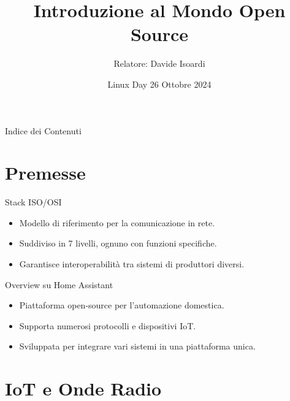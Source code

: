 \documentclass{beamer}
\title{Introduzione al Mondo Open Source}
\author{Relatore: Davide Isoardi}
\date{Linux Day 26 Ottobre 2024}
\begin{document}
	
	\begin{frame}
		\titlepage
	\end{frame}
	
	\begin{frame}{Indice dei Contenuti}
		\tableofcontents
	\end{frame}
	
	\section{Premesse}
	
	\begin{frame}{Stack ISO/OSI}
		\begin{itemize}
			\item Modello di riferimento per la comunicazione in rete.
			\item Suddiviso in 7 livelli, ognuno con funzioni specifiche.
			\item Garantisce interoperabilità tra sistemi di produttori diversi.
		\end{itemize}
	\end{frame}
	
	\begin{frame}{Overview su Home Assistant}
		\begin{itemize}
			\item Piattaforma open-source per l'automazione domestica.
			\item Supporta numerosi protocolli e dispositivi IoT.
			\item Sviluppata per integrare vari sistemi in una piattaforma unica.
		\end{itemize}
	\end{frame}
	
	\section{IoT e Onde Radio}
	
\end{document}
